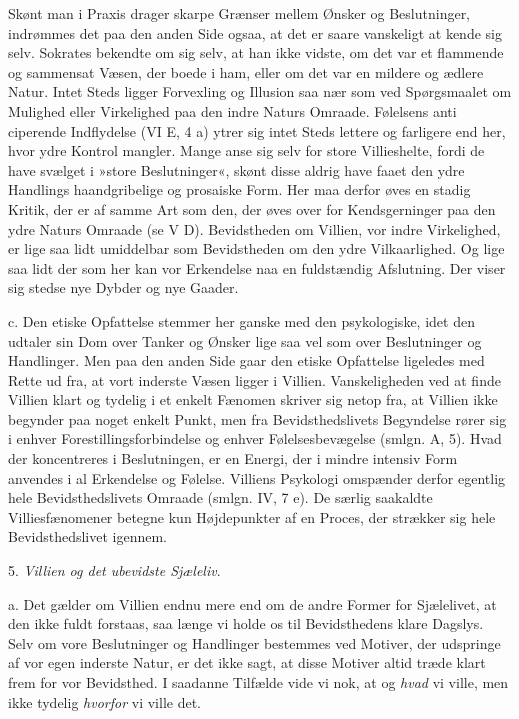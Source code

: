\documentclass[12pt,a4paper,openany]{book}
\newcommand{\opage}[1]{\marginnote{\footnotesize\textit{[#1]}}}
\begin{document}
Skønt man i Praxis drager skarpe Grænser mellem Ønsker og Beslutninger,
indrømmes det paa den anden Side ogsaa, at det er saare vanskeligt at
kende sig selv. Sokrates bekendte om sig selv, at han ikke vidste, om
det var et flammende og sammensat Væsen, der boede i ham, eller om det
var en mildere og ædlere Natur. Intet Steds ligger Forvexling og
Illusion saa nær som ved Spørgsmaalet om Mulighed eller Virkelighed paa
den indre Naturs Omraade. Følelsens anti%
\opage{397}ciperende Indflydelse (VI E, 4 a) ytrer sig intet Steds
lettere og farligere end her, hvor ydre Kontrol mangler. Mange anse sig
selv for store Villieshelte, fordi de have svælget i »store
Beslutninger«, skønt disse aldrig have faaet den ydre Handlings
haandgribelige og prosaiske Form. Her maa derfor øves en stadig Kritik,
der er af samme Art som den, der øves over for Kendsgerninger paa den
ydre Naturs Omraade (se V D). Bevidstheden om Villien, vor indre
Virkelighed, er lige saa lidt umiddelbar som Bevidstheden om den ydre
Vilkaarlighed. Og lige saa lidt der som her kan vor Erkendelse naa en
fuldstændig Afslutning. Der viser sig stedse nye Dybder og nye Gaader.

c. Den etiske Opfattelse stemmer her ganske med den psykologiske, idet
den udtaler sin Dom over Tanker og Ønsker lige saa vel som over
Beslutninger og Handlinger. Men paa den anden Side gaar den etiske
Opfattelse ligeledes med Rette ud fra, at vort inderste Væsen ligger i
Villien. Vanskeligheden ved at finde Villien klart og tydelig i et
enkelt Fænomen skriver sig netop fra, at Villien ikke begynder paa noget
enkelt Punkt, men fra Bevidsthedslivets Begyndelse rører sig i enhver
Forestillingsforbindelse og enhver Følelsesbevægelse (smlgn. A, 5). Hvad
der koncentreres i Beslutningen, er en Energi, der i mindre intensiv
Form anvendes i al Erkendelse og Følelse. Villiens Psykologi omspænder
derfor egentlig hele Bevidsthedslivets Omraade (smlgn. IV, 7 e). De
særlig saakaldte Villiesfænomener betegne kun Højdepunkter af en Proces,
der strækker sig hele Bevidsthedslivet igennem.

5. \emph{Villien og det ubevidste Sjæleliv}.

a. Det gælder om Villien endnu mere end om de andre Former for
Sjælelivet, at den ikke fuldt forstaas, saa længe vi holde os til
Bevidsthedens klare Dagslys. Selv om vore Beslutninger og Handlinger
bestemmes ved Motiver, der udspringe af vor egen inderste Natur, er det
ikke sagt, at disse Motiver altid træde klart frem for vor Bevidsthed. I
saadanne Tilfælde vide vi nok, at og \emph{hvad} vi ville, men ikke
tydelig \emph{hvorfor} vi ville det.
\end{document}

